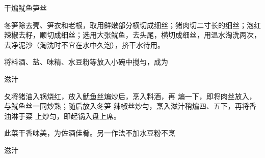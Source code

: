 \begin{recipe}{干煸鱿鱼笋丝}

\ingredients


\cooking

\step 冬笋除去壳、笋衣和老根，取用鲜嫩部分横切成细丝；猪肉切二寸长的细丝；泡红辣椒去籽，顺切成细丝；选用大张鱿鱼，去头尾，横切成细丝，用温水淘洗两次，去净泥沙（淘洗时不宜在水中久泡），挤干水待用。

\step 将料酒、盐、味精、水豆粉等放入小碗中搅勻，成为

滋汁

夂将猪油入锅烧红，放入鱿鱼丝煸炒后，烹入料酒，再 煸一下，即将肉丝放入，与鱿鱼丝一同炒熟；随后放入冬笋 辣椒丝炒勻，烹入滋汁稍煸四、五下，再将香油淋于菜 上炒匀，即起锅入盘上席。

\notes

此菜干香味美，为佐酒佳肴。另一作法不加水豆粉不烹

滋汁

\end{recipe}

